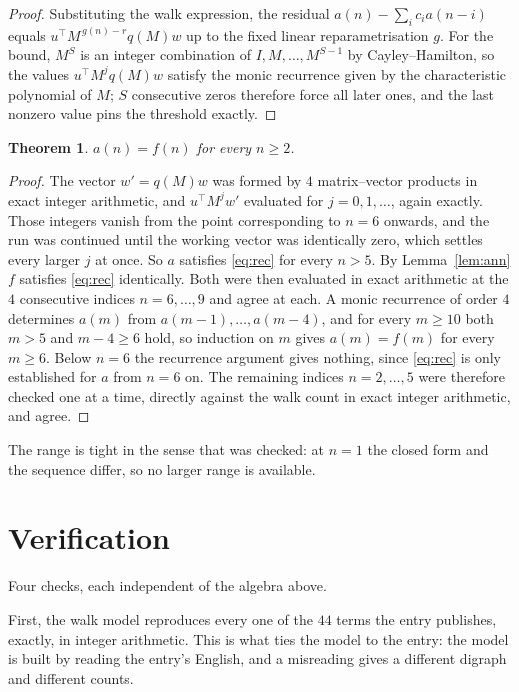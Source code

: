 \documentclass[11pt,a4paper]{article}
\theoremstyle{plain}
\newtheorem{theorem}{Theorem}
\theoremstyle{definition}
\begin{document}
\begin{proof}
Substituting the walk expression, the residual $a(n)-\sum_ic_ia(n-i)$ equals
$u^{\!\top}M^{\,g(n)-r}q(M)w$ up to the fixed linear reparametrisation $g$. For the bound,
$M^{S}$ is an integer combination of $I,M,\dots,M^{S-1}$ by Cayley--Hamilton, so the values
$u^{\!\top}M^{j}q(M)w$ satisfy the monic recurrence given by the characteristic polynomial of
$M$; $S$ consecutive zeros therefore force all later ones, and the last nonzero value pins the
threshold exactly.
\end{proof}

\begin{theorem}
$a(n)=f(n)$ for every $n\ge2$.
\end{theorem}

\begin{proof}
The vector $w'=q(M)w$ was formed by $4$ matrix--vector products in exact integer
arithmetic, and $u^{\!\top}M^{j}w'$ evaluated for $j=0,1,\dots$, again exactly. Those integers
vanish from the point corresponding to $n=6$ onwards, and the run was continued until the
working vector was identically zero, which settles every larger $j$ at once. So $a$ satisfies
\eqref{eq:rec} for every $n>5$. By Lemma~\ref{lem:ann} $f$ satisfies \eqref{eq:rec}
identically. Both were then evaluated in exact arithmetic at the $4$ consecutive indices
$n=6,\dots,9$ and agree at each. A monic recurrence of order $4$
determines $a(m)$ from $a(m-1),\dots,a(m-4)$, and for every $m\ge10$ both
$m>5$ and $m-4\ge6$ hold, so induction on $m$ gives $a(m)=f(m)$ for every
$m\ge6$.
Below $n=6$ the recurrence argument gives nothing, since \eqref{eq:rec} is only
established for $a$ from $n=6$ on. The remaining indices $n=2,\dots,5$ were
therefore checked one at a time, directly against the walk count in exact integer arithmetic,
and agree.
\end{proof}

The range is tight in the sense that was checked: at $n=1$ the closed form and the sequence differ, so no larger range is available.

\section{Verification}

Four checks, each independent of the algebra above.

First, the walk model reproduces every one of the $44$ terms the entry publishes,
exactly, in integer arithmetic. This is what ties the model to the entry: the model is built
by reading the entry's English, and a misreading gives a different digraph and different
counts.
\end{document}
